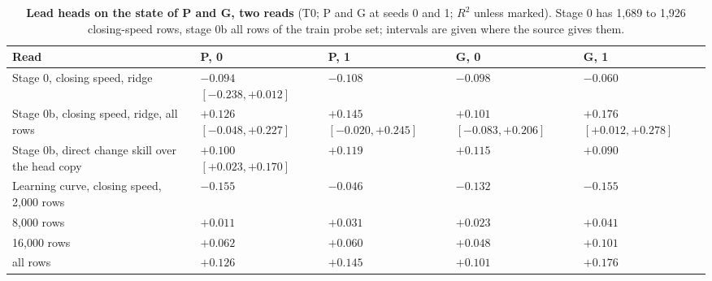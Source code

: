 \documentclass[10pt,twocolumn]{article}
\theoremstyle{remark}
\newcommand{\tier}[1]{\textsc{\small #1}}
\begin{document}
\begin{table}[!tp]
\centering
\caption{\textbf{Lead heads on the state of P and G, two reads} (\tier{T0}; P and G at seeds 0 and 1; $R^2$ unless marked). Stage 0 has 1,689 to 1,926 closing-speed rows, stage 0b all rows of the train probe set; intervals are given where the source gives them.}
\label{tab:leadA}
\scriptsize
\begin{tabularx}{\textwidth}{@{}>{\raggedright\arraybackslash}p{50mm}>{\raggedright\arraybackslash}X>{\raggedright\arraybackslash}X>{\raggedright\arraybackslash}X>{\raggedright\arraybackslash}X@{}}
\toprule
Read & P, 0 & P, 1 & G, 0 & G, 1 \\
\midrule
Stage 0, closing speed, ridge & $-0.094$ $[-0.238,+0.012]$ & $-0.108$ & $-0.098$ & $-0.060$ \\
Stage 0b, closing speed, ridge, all rows & $+0.126$ $[-0.048,+0.227]$ & $+0.145$ $[-0.020,+0.245]$ & $+0.101$ $[-0.083,+0.206]$ & $+0.176$ $[+0.012,+0.278]$ \\
Stage 0b, direct change skill over the head copy & $+0.100$ $[+0.023,+0.170]$ & $+0.119$ & $+0.115$ & $+0.090$ \\
Learning curve, closing speed, 2,000 rows & $-0.155$ & $-0.046$ & $-0.132$ & $-0.155$ \\
\hspace{3mm}8,000 rows & $+0.011$ & $+0.031$ & $+0.023$ & $+0.041$ \\
\hspace{3mm}16,000 rows & $+0.062$ & $+0.060$ & $+0.048$ & $+0.101$ \\
\hspace{3mm}all rows & $+0.126$ & $+0.145$ & $+0.101$ & $+0.176$ \\
\bottomrule
\end{tabularx}
\end{table}
\end{document}
